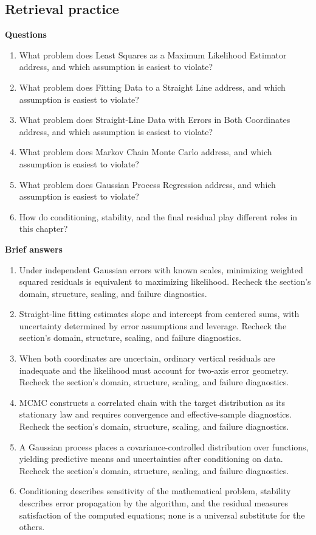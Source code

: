 \documentclass[10pt,letterpaper]{article}
\begin{document}
\subsection*{Retrieval practice}
\textbf{Questions}
\begin{enumerate}
\item What problem does Least Squares as a Maximum Likelihood Estimator address, and which assumption is easiest to violate?
\item What problem does Fitting Data to a Straight Line address, and which assumption is easiest to violate?
\item What problem does Straight-Line Data with Errors in Both Coordinates address, and which assumption is easiest to violate?
\item What problem does Markov Chain Monte Carlo address, and which assumption is easiest to violate?
\item What problem does Gaussian Process Regression address, and which assumption is easiest to violate?
\item How do conditioning, stability, and the final residual play different roles in this chapter?
\end{enumerate}

\textbf{Brief answers}
\begin{enumerate}
\item Under independent Gaussian errors with known scales, minimizing weighted squared residuals is equivalent to maximizing likelihood. Recheck the section's domain, structure, scaling, and failure diagnostics.
\item Straight-line fitting estimates slope and intercept from centered sums, with uncertainty determined by error assumptions and leverage. Recheck the section's domain, structure, scaling, and failure diagnostics.
\item When both coordinates are uncertain, ordinary vertical residuals are inadequate and the likelihood must account for two-axis error geometry. Recheck the section's domain, structure, scaling, and failure diagnostics.
\item MCMC constructs a correlated chain with the target distribution as its stationary law and requires convergence and effective-sample diagnostics. Recheck the section's domain, structure, scaling, and failure diagnostics.
\item A Gaussian process places a covariance-controlled distribution over functions, yielding predictive means and uncertainties after conditioning on data. Recheck the section's domain, structure, scaling, and failure diagnostics.
\item Conditioning describes sensitivity of the mathematical problem, stability describes error propagation by the algorithm, and the residual measures satisfaction of the computed equations; none is a universal substitute for the others.
\end{enumerate}
\end{document}
